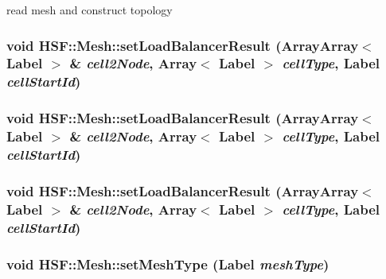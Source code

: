 read mesh and construct topology \hypertarget{classHSF_1_1Mesh_aef90381f0de5a072b710906f955717fd}{
\subsubsection[{setLoadBalancerResult}]{\setlength{\rightskip}{0pt plus 5cm}void HSF::Mesh::setLoadBalancerResult ({\bf ArrayArray}$<$ {\bf Label} $>$ \& {\em cell2Node}, \/  Array$<$ {\bf Label} $>$ {\em cellType}, \/  {\bf Label} {\em cellStartId})}}
\label{classHSF_1_1Mesh_aef90381f0de5a072b710906f955717fd}
\hypertarget{classHSF_1_1Mesh_aef90381f0de5a072b710906f955717fd}{
\subsubsection[{setLoadBalancerResult}]{\setlength{\rightskip}{0pt plus 5cm}void HSF::Mesh::setLoadBalancerResult ({\bf ArrayArray}$<$ {\bf Label} $>$ \& {\em cell2Node}, \/  Array$<$ {\bf Label} $>$ {\em cellType}, \/  {\bf Label} {\em cellStartId})}}
\label{classHSF_1_1Mesh_aef90381f0de5a072b710906f955717fd}
\hypertarget{classHSF_1_1Mesh_aef90381f0de5a072b710906f955717fd}{
\subsubsection[{setLoadBalancerResult}]{\setlength{\rightskip}{0pt plus 5cm}void HSF::Mesh::setLoadBalancerResult ({\bf ArrayArray}$<$ {\bf Label} $>$ \& {\em cell2Node}, \/  Array$<$ {\bf Label} $>$ {\em cellType}, \/  {\bf Label} {\em cellStartId})}}
\label{classHSF_1_1Mesh_aef90381f0de5a072b710906f955717fd}
\hypertarget{classHSF_1_1Mesh_a00a74cf612e08f90f88ada5c33a2a802}{
\subsubsection[{setMeshType}]{\setlength{\rightskip}{0pt plus 5cm}void HSF::Mesh::setMeshType ({\bf Label} {\em meshType})}}
